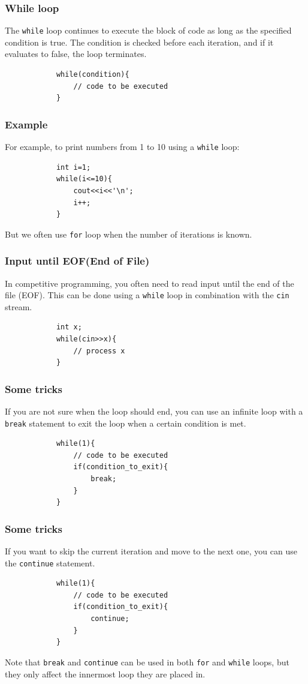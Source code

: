 \documentclass[xcolor=dvipsnames]{beamer}
\begin{document}
    \begin{frame}[fragile]
        \frametitle{While loop}
        The \texttt{while} loop continues to execute the block of code as long as the specified condition is true. The condition is checked before each iteration, and if it evaluates to false, the loop terminates.
        \begin{verbatim}
            while(condition){
                // code to be executed
            }
        \end{verbatim}
    \end{frame}
    \begin{frame}[fragile]
        \frametitle{Example}
        For example, to print numbers from 1 to 10 using a \texttt{while} loop:
        \begin{verbatim}
            int i=1;
            while(i<=10){
                cout<<i<<'\n';
                i++;
            }
        \end{verbatim}
        But we often use \texttt{for} loop when the number of iterations is known.
    \end{frame}
    \begin{frame}[fragile]
        \frametitle{Input until EOF(End of File)}
        In competitive programming, you often need to read input until the end of the file (EOF). This can be done using a \texttt{while} loop in combination with the \texttt{cin} stream.
        \begin{verbatim}
            int x;
            while(cin>>x){
                // process x
            }
        \end{verbatim}
    \end{frame}
    \begin{frame}[fragile]
        \frametitle{Some tricks}
        If you are not sure when the loop should end, you can use an infinite loop with a \texttt{break} statement to exit the loop when a certain condition is met.
        \begin{verbatim}
            while(1){
                // code to be executed
                if(condition_to_exit){
                    break;
                }
            }
        \end{verbatim}
    \end{frame}
    \begin{frame}[fragile]
        \frametitle{Some tricks}
        If you want to skip the current iteration and move to the next one, you can use the \texttt{continue} statement.
        \begin{verbatim}
            while(1){
                // code to be executed
                if(condition_to_exit){
                    continue;
                }
            }
        \end{verbatim}
        Note that \texttt{break} and \texttt{continue} can be used in both \texttt{for} and \texttt{while} loops, but they only affect the innermost loop they are placed in.
    \end{frame}
\end{document}
